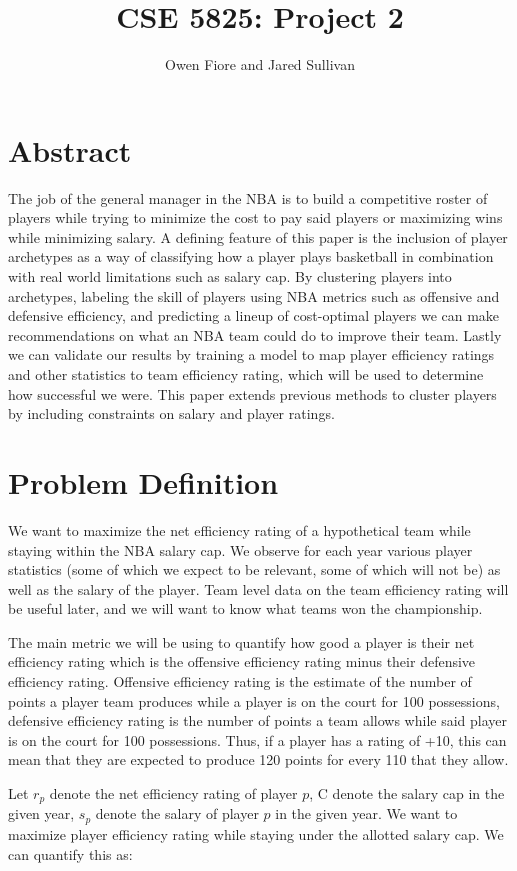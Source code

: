 \documentclass[12pt, letterpaper, titlepage]{article}
\title{CSE 5825: Project 2}
\author{Owen Fiore and Jared Sullivan}
\begin{document}
\maketitle

\section{Abstract}
The job of the general manager in the NBA is to build a competitive roster of players while trying to minimize the cost to pay said players or maximizing wins while minimizing salary. A defining feature of this paper is the inclusion of player archetypes as a way of classifying how a player plays basketball in combination with real world limitations such as salary cap. By clustering players into archetypes, labeling the skill of players using NBA metrics such as offensive and defensive efficiency, and predicting a lineup of cost-optimal players we can make recommendations on what an NBA team could do to improve their team. Lastly we can validate our results by training a model to map player efficiency ratings and other statistics to team efficiency rating, which will be used to determine how successful we were. This paper extends previous methods to cluster players by including constraints on salary and player ratings.
\section{Problem Definition}
We want to maximize the net efficiency rating of a hypothetical team while staying within the NBA salary cap. We observe for each year various player statistics (some of which we expect to be relevant, some of which will not be) as well as the salary of the player. Team level data on the team efficiency rating will be useful later, and we will want to know what teams won the championship.

The main metric we will be using to quantify how good a player is their net efficiency rating which is the offensive efficiency rating minus their defensive efficiency rating. Offensive efficiency rating is the estimate of the number of points a player team produces while a player is on the court for 100 possessions, defensive efficiency rating is the number of points a team allows while said player is on the court for 100 possessions.  Thus, if a player has a rating of +10, this can mean that they are expected to produce 120 points for every 110 that they allow. 

Let $r_p$ denote the net efficiency rating of player $p$, C denote the salary cap in the given year, $s_p$ denote the salary of player $p$ in the given year.  We want to maximize player efficiency rating while staying under the allotted salary cap. We can quantify this as:
\end{document}
